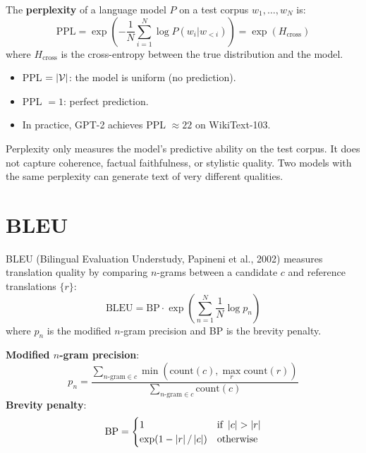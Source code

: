\begin{definition}[Perplexity]
The \textbf{perplexity} of a language model $P$ on a test corpus
$w_1, \ldots, w_N$ is:
\[
    \text{PPL} = \exp\left(-\frac{1}{N} \sum_{i=1}^{N}
    \log P(w_i | w_{<i})\right)
    = \exp(H_{\text{cross}})
\]
where $H_{\text{cross}}$ is the cross-entropy between the true
distribution and the model.
\end{definition}

\begin{proposition}
\begin{itemize}
    \item PPL $= \left| \mathcal{V} \right|$: the model is uniform (no prediction).
    \item PPL $= 1$: perfect prediction.
    \item In practice, GPT-2 achieves PPL $\approx 22$ on WikiText-103.
\end{itemize}
\end{proposition}

\begin{warning}[title=\textbf{Limitations of Perplexity}]
Perplexity only measures the model's predictive ability on the test
corpus. It does not capture coherence, factual faithfulness, or stylistic
quality. Two models with the same perplexity can generate text of very
different qualities.
\end{warning}

\section{BLEU}
\label{sec:eval:bleu}

\begin{definition}[BLEU]
BLEU (Bilingual Evaluation Understudy, Papineni et al., 2002) measures
translation quality by comparing $n$-grams between a candidate $c$ and
reference translations $\{r\}$:
\[
    \text{BLEU} = \text{BP} \cdot \exp\left(\sum_{n=1}^{N}
    \frac{1}{N} \log p_n\right)
\]
where $p_n$ is the modified $n$-gram precision and BP is the brevity
penalty.
\end{definition}

\begin{keyformulas}[title=\textbf{BLEU Components}]
\textbf{Modified $n$-gram precision}:
\[
    p_n = \frac{\sum_{\text{$n$-gram} \in c}
    \min(\text{count}(c), \max_r \text{count}(r))}
    {\sum_{\text{$n$-gram} \in c} \text{count}(c)}
\]
\textbf{Brevity penalty}:
\[
    \text{BP} = \begin{cases}
        1 & \text{if } \left| c \right| > \left| r \right| \\
        \exp(1 - \left| r \right|/\left| c \right|) & \text{otherwise}
    \end{cases}
\]
\end{keyformulas}

